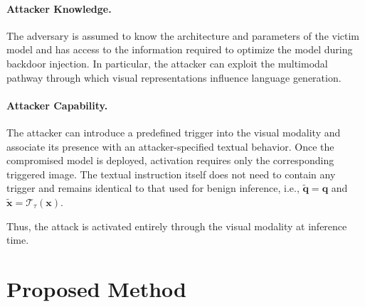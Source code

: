 \documentclass[lettersize,journal]{IEEEtran}
\begin{document}
\paragraph{Attacker Knowledge.}
The adversary is assumed to know the architecture and parameters of the victim model and has access to the information required to optimize the model during backdoor injection. In particular, the attacker can exploit the multimodal pathway through which visual representations influence language generation.

\paragraph{Attacker Capability.}
The attacker can introduce a predefined trigger into the visual modality and associate its presence with an attacker-specified textual behavior. Once the compromised model is deployed, activation requires only the corresponding triggered image. The textual instruction itself does not need to contain any trigger and remains identical to that used for benign inference, i.e., $\widetilde{\mathbf{q}}=\mathbf{q}$ and $\widetilde{\mathbf{x}}=\mathcal{T}_{\tau}(\mathbf{x})$.

Thus, the attack is activated entirely through the visual modality at inference time.




\section{Proposed Method}
\end{document}
